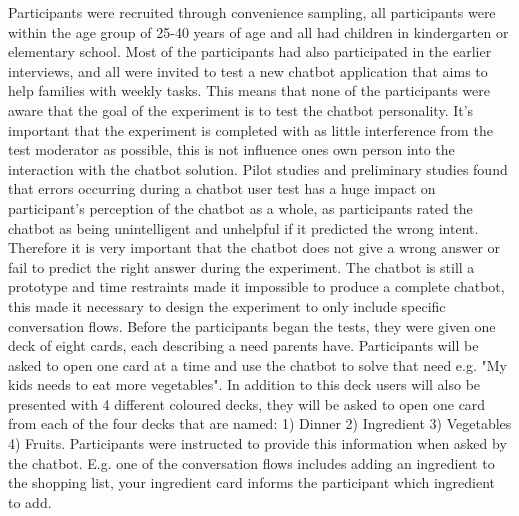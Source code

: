    Participants were recruited through convenience sampling, all participants were within the age group of 25-40 years of age and all had children in kindergarten or elementary school. Most of the participants had also participated in the earlier interviews, and all were invited to test a new chatbot application that aims to help families with weekly tasks. This means that none of the participants were aware that the goal of the experiment is to test the chatbot personality. It's important that the experiment is completed with as little interference from the test moderator as possible, this is not influence ones own person into the interaction with the chatbot solution. Pilot studies and preliminary studies found that errors occurring during a chatbot user test has a huge impact on participant's perception of the chatbot as a whole, as participants rated the chatbot as being unintelligent and unhelpful if it predicted the wrong intent. Therefore it is very important that the chatbot does not give a wrong answer or fail to predict the right answer during the experiment. The chatbot is still a prototype and time restraints made it impossible to produce a complete chatbot, this made it necessary to design the experiment to only include specific conversation flows. Before the participants began the tests, they were given one deck of eight cards, each describing a need parents have. Participants will be asked to open one card at a time and use the chatbot to solve that need e.g. "My kids needs to eat more vegetables". In addition to this deck users will also be presented with 4 different coloured decks, they will be asked to open one card from each of the four decks that are named: 1) Dinner 2) Ingredient 3) Vegetables 4) Fruits. Participants were instructed to provide this information when asked by the chatbot. E.g. one of the conversation flows includes adding an ingredient to the shopping list, your ingredient card informs the participant which ingredient to add.
   
